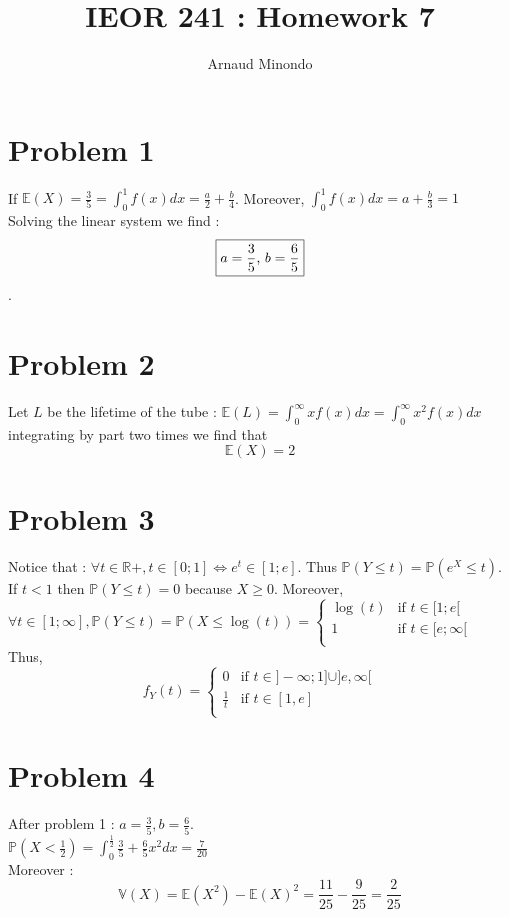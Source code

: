 \documentclass{article}
\title{IEOR 241 : Homework 7}
\author{Arnaud Minondo}
\begin{document}
\maketitle
\section*{Problem 1}
If $\mathbb{E}(X) = \frac{3}{5} = \int_{0}^1f(x)dx = \frac{a}{2}+\frac{b}{4}$. Moreover, $\int_0^1f(x)dx = a+\frac{b}{3} = 1$
\\
Solving the linear system we find : $$\boxed{a = \frac{3}{5}$, $b = \dfrac{6}{5}}$$.
\section*{Problem 2}
Let $L$ be the lifetime of the tube : $\mathbb{E}(L) = \int_{0}^\infty xf(x)dx = \int_{0}^\infty x^2f(x)dx$ integrating by part two times we find that $$\boxed{\mathbb{E}(X) = 2}$$

\section*{Problem 3}
Notice that : $\forall t \in \mathbb{R}+, t\in[0;1] \Longleftrightarrow e^t\in[1;e]$. Thus $\mathbb{P}(Y\leq t) = \mathbb{P}(e^X\leq t)$. If $t<1$ then $\mathbb{P}(Y\leq t) = 0$ because $X\ge 0$.
Moreover, $\forall t\in [1;\infty], \mathbb{P}(Y\leq t) = \mathbb{P}(X\leq \log(t)) = \left\{\begin{array}{ll}
    \log(t) & \text{if } t\in [1;e[\\
    1 & \text{if } t\in [e;\infty[\\
\end{array}\right.$
Thus, $$\boxed{f_Y(t) = \left\{\begin{array}{ll}
    0 & \text{if } t\in ]-\infty;1]\cup]e, \infty[\\
    \frac{1}{t} & \text{if } t\in [1,e]\\
\end{array}\right.}$$

\section*{Problem 4}
After problem 1 : $a=\frac{3}{5}, b=\frac{6}{5}$.\\
$\mathbb{P}(X<\frac{1}{2}) = \int_0^{\frac{1}{2}}\frac{3}{5}+\frac{6}{5}x^2dx = \frac{7}{20}$\\
Moreover : $$\boxed{\mathbb{V}(X) = \mathbb{E}(X^2)-\mathbb{E}(X)^2 = \frac{11}{25}-\frac{9}{25} = \frac{2}{25}}$$
\end{document}
